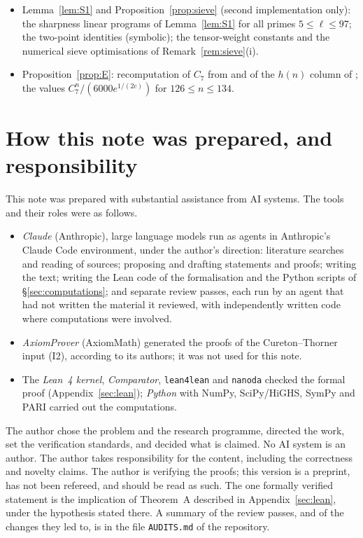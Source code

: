\documentclass[11pt]{amsart}
\theoremstyle{definition}
\theoremstyle{remark}
\begin{document}
\begin{itemize}[leftmargin=*]
  (second implementation), and all subgroups for $\ell\le13$ (first).
\item Lemma~\ref{lem:S1} and Proposition~\ref{prop:sieve} (second implementation only): the sharpness linear programs of
  Lemma~\ref{lem:S1} for all primes $5\le\ell\le97$; the two-point identities (symbolic); the tensor-weight constants and
  the numerical sieve optimisations of Remark~\ref{rem:sieve}(i).
\item Proposition~\ref{prop:E}: recomputation of $C_7$ from \cite[Table~1]{LK} and of the $h(n)$ column of
  \cite[Table~7]{LK}; the values $C_7^n/(6000e^{1/(2c)})$ for $126\le n\le134$.
\end{itemize}

\section{How this note was prepared, and responsibility}\label{sec:provenance}

This note was prepared with substantial assistance from AI systems. The tools and their roles were as follows.
\begin{itemize}[leftmargin=*]
\item \emph{Claude} (Anthropic), large language models run as agents in Anthropic's Claude Code environment, under
  the author's direction: literature searches and reading of sources; proposing and drafting statements and proofs;
  writing the text; writing the Lean code of the formalisation and the Python scripts of \S\ref{sec:computations};
  and separate review passes, each run by an agent that had not written the material it reviewed, with independently
  written code where computations were involved.
\item \emph{AxiomProver} (AxiomMath) generated the proofs of the Cureton--Thorner input (I2), according to its
  authors; it was not used for this note.
\item The \emph{Lean~4 kernel}, \emph{Comparator}, \texttt{lean4lean} and \texttt{nanoda} checked the formal proof
  (Appendix~\ref{sec:lean}); \emph{Python} with NumPy, SciPy/HiGHS, SymPy and PARI carried out the computations.
\end{itemize}
The author chose the problem and the research programme, directed the work, set the verification standards, and
decided what is claimed. No AI system is an author. The author takes responsibility for the content, including the
correctness and novelty claims. The author is verifying the proofs; this version is a preprint, has not been refereed,
and should be read as such. The one formally verified statement is the implication of Theorem~A described in
Appendix~\ref{sec:lean}, under the hypothesis stated there. A summary of the review passes, and of the changes they
led to, is in the file \texttt{AUDITS.md} of the repository.
\end{document}
